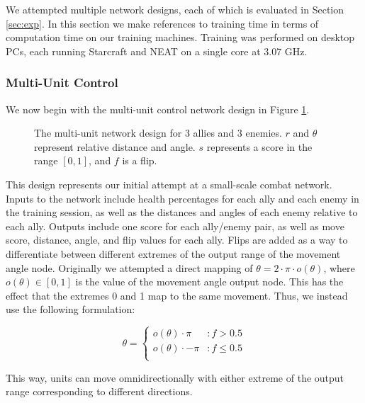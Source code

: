 \documentclass[10pt,a4paper,twocolumn]{article}
\begin{document}
We attempted multiple network designs, each of which is evaluated in Section \ref{sec:exp}. In this section we make references to training time in terms of computation time on our training machines. Training was performed on desktop PCs, each running Starcraft and NEAT on a single core at 3.07 GHz.

\subsubsection{Multi-Unit Control}
\label{sec:multiunit_design}

We now begin with the multi-unit control network design in Figure \ref{fig:design_multiunit}.

\begin{figure}

\caption{The multi-unit network design for 3 allies and 3 enemies. $r$ and $\theta$ represent relative distance and angle. $s$ represents a score in the range $[0,1]$, and $f$ is a flip.}
\label{fig:design_multiunit}
\end{figure}

This design represents our initial attempt at a small-scale combat network. Inputs to the network include health percentages for each ally and each enemy in the training session, as well as the distances and angles of each enemy relative to each ally. Outputs include one score for each ally/enemy pair, as well as move score, distance, angle, and flip values for each ally. Flips are added as a way to differentiate between different extremes of the output range of the movement angle node. Originally we attempted a direct mapping of $\theta = 2 \cdot \pi \cdot o(\theta)$, where $o(\theta) \in [0,1]$ is the value of the movement angle output node. This has the effect that the extremes 0 and 1 map to the same movement. Thus, we instead use the following formulation:

 \begin{displaymath}
   \theta = \left\{
     \begin{array}{lr}
       o(\theta) \cdot \pi & : f > 0.5\\
       o(\theta) \cdot -\pi & : f \leq 0.5\\
     \end{array}
   \right.
\end{displaymath}

This way, units can move omnidirectionally with either extreme of the output range corresponding to different directions.
\end{document}
